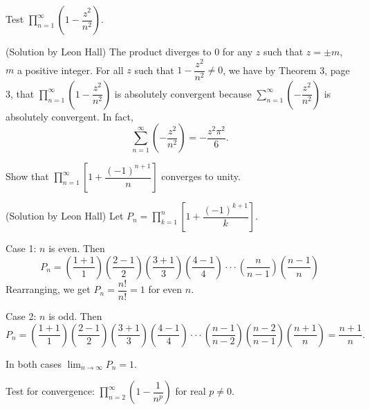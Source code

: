 \begin{problem}\label{problem7chapter1}
Test $\displaystyle\prod_{n=1}^{\infty} \left( 1 - \dfrac{z^2}{n^2} \right).$
\end{problem}
\begin{solution}(Solution by Leon Hall)
The product diverges to $0$ for any $z$ such that $z = \pm m$, $m$ a positive integer. For all $z$ such that $1 - \dfrac{z^2}{n^2} \neq 0$, we have by Theorem 3, page 3, that $\displaystyle\prod_{n=1}^{\infty} \left( 1 - \dfrac{z^2}{n^2} \right)$ is absolutely convergent because $\displaystyle\sum_{n=1}^{\infty} \left( - \dfrac{z^2}{n^2} \right)$ is absolutely convergent. In fact,
$$\displaystyle\sum_{n=1}^{\infty} \left( - \dfrac{z^2}{n^2} \right) = -\dfrac{z^2 \pi^2}{6}.$$
\end{solution}
\begin{problem}\label{problem8chapter1}
Show that $\displaystyle\prod_{n=1}^{\infty} \left[ 1 + \dfrac{(-1)^{n+1}}{n} \right]$ converges to unity.
\end{problem}
\begin{solution}(Solution by Leon Hall)
Let $P_n = \displaystyle\prod_{k=1}^n \left[ 1 + \dfrac{(-1)^{k+1}}{k} \right]$.

Case 1: $n$ is even. Then
$$P_n = \left( \dfrac{1+1}{1} \right) \left( \dfrac{2-1}{2} \right) \left( \dfrac{3+1}{3} \right) \left( \dfrac{4-1}{4} \right) \cdot \cdot \cdot  \left( \dfrac{n}{n-1}  \right) \left( \dfrac{n-1}{n} \right)$$ 
Rearranging, we get $P_n = \dfrac{n!}{n!} = 1$ for even $n$.

Case 2: $n$ is odd. Then
$$P_n = \left( \dfrac{1+1}{1} \right) \left( \dfrac{2-1}{2} \right) \left( \dfrac{3+1}{3} \right) \left( \dfrac{4-1}{4} \right)  \cdot \cdot \cdot \left( \dfrac{n-1}{n-2} \right) \left( \dfrac{n-2}{n-1} \right) \left( \dfrac{n+1}{n} \right)  = \dfrac{n+1}{n}.$$

In both cases $\displaystyle\lim_{n \rightarrow \infty} P_n = 1$.
\end{solution}
\begin{problem}\label{problem9chapter1}
Test for convergence: $\displaystyle\prod_{n=2}^{\infty} \left( 1 - \dfrac{1}{n^p} \right)$ for real $p \neq 0$.
\end{problem}
